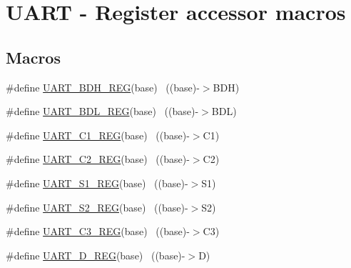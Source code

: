 \hypertarget{group___u_a_r_t___register___accessor___macros}{}\section{U\+A\+RT -\/ Register accessor macros}
\label{group___u_a_r_t___register___accessor___macros}
\subsection*{Macros}
\begin{DoxyCompactItemize}
\item 
\#define \hyperlink{group___u_a_r_t___register___accessor___macros_ga3cad0e41deb6b429abe066c0ef976e27}{U\+A\+R\+T\+\_\+\+B\+D\+H\+\_\+\+R\+EG}(base)                                          ~((base)-\/$>$B\+DH)
\item 
\#define \hyperlink{group___u_a_r_t___register___accessor___macros_ga5a5b3d9a31233e9411d5faf9f75cef37}{U\+A\+R\+T\+\_\+\+B\+D\+L\+\_\+\+R\+EG}(base)                                          ~((base)-\/$>$B\+DL)
\item 
\#define \hyperlink{group___u_a_r_t___register___accessor___macros_gaf1364840dbdc70f6ca2931518a3f0c04}{U\+A\+R\+T\+\_\+\+C1\+\_\+\+R\+EG}(base)                                            ~((base)-\/$>$C1)
\item 
\#define \hyperlink{group___u_a_r_t___register___accessor___macros_ga09dd2d71c0fb360ed55f2ef2aca2cdcd}{U\+A\+R\+T\+\_\+\+C2\+\_\+\+R\+EG}(base)                                            ~((base)-\/$>$C2)
\item 
\#define \hyperlink{group___u_a_r_t___register___accessor___macros_gae94e819cfe08eebd802bc5d3c2bd4c05}{U\+A\+R\+T\+\_\+\+S1\+\_\+\+R\+EG}(base)                                            ~((base)-\/$>$S1)
\item 
\#define \hyperlink{group___u_a_r_t___register___accessor___macros_ga02efefc75cacb156375e2bff39a1f497}{U\+A\+R\+T\+\_\+\+S2\+\_\+\+R\+EG}(base)                                            ~((base)-\/$>$S2)
\item 
\#define \hyperlink{group___u_a_r_t___register___accessor___macros_ga94048a3faaadf9a76ac1e9ea865d7f4e}{U\+A\+R\+T\+\_\+\+C3\+\_\+\+R\+EG}(base)                                            ~((base)-\/$>$C3)
\item 
\#define \hyperlink{group___u_a_r_t___register___accessor___macros_ga53bbf3e214fcc4cba0059aca0184ce6f}{U\+A\+R\+T\+\_\+\+D\+\_\+\+R\+EG}(base)                                              ~((base)-\/$>$D)

\end{DoxyCompactItemize}

